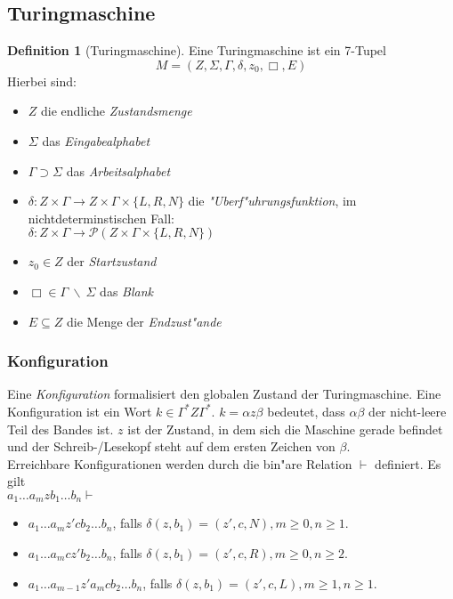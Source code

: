 \documentclass[german, 10pt, a4paper, twocolumn]{scrartcl}
\theoremstyle{definition}
\newtheorem*{definition}{Definition}
\theoremstyle{example}
\begin{document}
\subsection{Turingmaschine}

\begin{definition}[Turingmaschine]
	Eine Turingmaschine ist ein 7-Tupel
	\begin{displaymath}
		M = (Z, \Sigma, \Gamma, \delta, z_0, \Box, E)
	\end{displaymath}
	Hierbei sind:
	\begin{itemize}
		\item $Z$ die endliche \textit{Zustandsmenge}
		\item $\Sigma$ das \textit{Eingabealphabet}
		\item $\Gamma \supset \Sigma$ das \textit{Arbeitsalphabet}
		\item $\delta : Z \times \Gamma \rightarrow Z \times \Gamma \times \{L,R,N\}$ die \textit{"Uberf"uhrungsfunktion}, im nichtdeterminstischen Fall:\\
			$\delta: Z \times \Gamma \rightarrow \mathcal{P}(Z\times \Gamma \times \{L,R,N\})$
		\item $z_0 \in Z$ der \textit{Startzustand}
		\item $\Box \in \Gamma \ \backslash \ \Sigma$ das \textit{Blank}
		\item $E \subseteq Z$ die Menge der \textit{Endzust"ande}
	\end{itemize}
\end{definition}

\subsubsection{Konfiguration}

Eine \textit{Konfiguration} formalisiert den globalen Zustand der Turingmaschine. Eine Konfiguration ist ein Wort $k \in \Gamma^* Z \Gamma^*$. $k=\alpha z \beta$ bedeutet, dass $\alpha \beta$ der nicht-leere Teil des Bandes ist. $z$ ist der Zustand, in dem sich die Maschine gerade befindet und der Schreib-/Lesekopf steht auf dem ersten Zeichen von $\beta$.\\

Erreichbare Konfigurationen werden durch die bin"are Relation $\vdash$ definiert. Es gilt\\

\small
$a_1 \ldots a_m z b_1 \ldots b_n \vdash$
	\begin{itemize}
		\item $a_1 \ldots a_m z' c b_2 \ldots b_n$, falls $\delta(z,b_1)= (z',c,N), m \geq 0, n \geq 1$.
		\item $a_1 \ldots a_m c z' b_2 \ldots b_n$, falls $\delta(z,b_1)= (z',c,R), m \geq 0, n \geq 2$.
		\item $a_1 \ldots a_{m-1} z' a_m c b_2 \ldots b_n$, falls $\delta(z,b_1)= (z',c,L), m \geq 1, n \geq 1$.
	\end{itemize}
\normalsize
\end{document}
